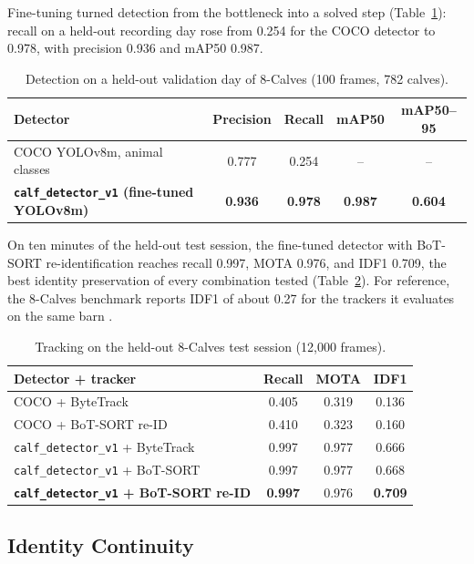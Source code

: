 \documentclass[11pt,letterpaper]{article}
\begin{document}
Fine-tuning turned detection from the bottleneck into a solved step (Table~\ref{tab:detector}): recall on a held-out recording day rose from 0.254 for the COCO detector to 0.978, with precision 0.936 and mAP50 0.987.

\begin{table}[H]
\centering
\caption{Detection on a held-out validation day of 8-Calves (100 frames, 782 calves).}
\label{tab:detector}
\small
\begin{tabular}{lcccc}
\toprule
Detector & Precision & Recall & mAP50 & mAP50--95 \\
\midrule
COCO YOLOv8m, animal classes & 0.777 & 0.254 & -- & -- \\
\textbf{\texttt{calf\_detector\_v1} (fine-tuned YOLOv8m)} & \textbf{0.936} & \textbf{0.978} & \textbf{0.987} & \textbf{0.604} \\
\bottomrule
\end{tabular}
\end{table}

On ten minutes of the held-out test session, the fine-tuned detector with BoT-SORT re-identification reaches recall 0.997, MOTA 0.976, and IDF1 0.709, the best identity preservation of every combination tested (Table~\ref{tab:tracking}). For reference, the 8-Calves benchmark reports IDF1 of about 0.27 for the trackers it evaluates on the same barn \cite{fang2025eightcalves}.

\begin{table}[H]
\centering
\caption{Tracking on the held-out 8-Calves test session (12{,}000 frames).}
\label{tab:tracking}
\small
\begin{tabular}{lccc}
\toprule
Detector + tracker & Recall & MOTA & IDF1 \\
\midrule
COCO + ByteTrack & 0.405 & 0.319 & 0.136 \\
COCO + BoT-SORT re-ID & 0.410 & 0.323 & 0.160 \\
\texttt{calf\_detector\_v1} + ByteTrack & 0.997 & 0.977 & 0.666 \\
\texttt{calf\_detector\_v1} + BoT-SORT & 0.997 & 0.977 & 0.668 \\
\textbf{\texttt{calf\_detector\_v1} + BoT-SORT re-ID} & \textbf{0.997} & 0.976 & \textbf{0.709} \\
\bottomrule
\end{tabular}
\end{table}

\subsection{Identity Continuity}
\label{sec:continuity}
\end{document}
